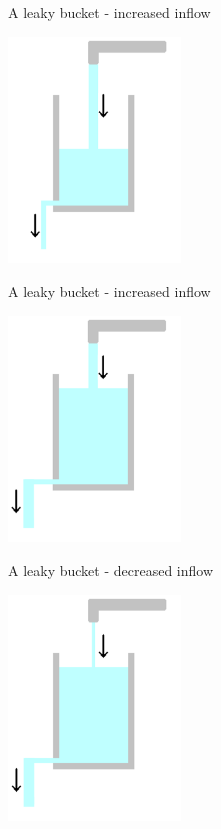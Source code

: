 \documentclass{beamer}
\begin{document}
\begin{frame}{A leaky bucket - increased inflow}

  \begin{center}
    \includegraphics[height=6cm]{glass_tap_up.png}
  \end{center}
  
  
\end{frame}



\begin{frame}{A leaky bucket - increased inflow}

  \begin{center}
    \includegraphics[height=6cm]{glass_level_up.png}
  \end{center}
  
  
\end{frame}



\begin{frame}{A leaky bucket - decreased inflow}

  \begin{center}
    \includegraphics[height=6cm]{glass_tap_down.png}
  \end{center}
  
  
\end{frame}
\end{document}
